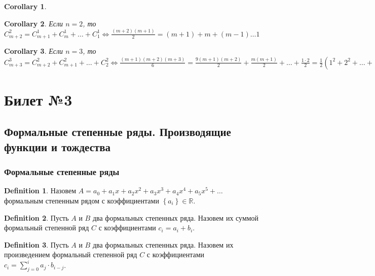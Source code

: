 \documentclass[a4paper]{article}
\theoremstyle{plain}
\newtheorem{corollary}{Corollary}
\theoremstyle{remark}
\theoremstyle{definition}
\newtheorem{definition}{Definition}
\newcommand{\combru}[2]{C_{#1}^{#2}} %
\newcommand{\myR}{\mathbb{R}}
\newcommand{\mysum}{\sum\limits}
\newcommand{\myset}[1]{\left\{ #1 \right\}}
\begin{document}
\begin{itemize}
\begin{corollary}
		\end{corollary}
		\begin{corollary}
			Если $n = 2$, то $\combru{m+2}{2} = \combru{m+1}{1} + \combru{m}{1} + \ldots + \combru{1}{1} \Leftrightarrow \frac{(m + 2)(m + 1)}{2} = (m + 1) + m + (m - 1) \ldots 1$
		\end{corollary}
		\begin{corollary}
			Если $n = 3$, то $\combru{m+3}{3} = \combru{m+2}{2} + \combru{m+1}{2} + \ldots + \combru{2}{2} \Leftrightarrow \frac{(m + 1)(m + 2)(m + 3)}{6} = \frac{9(m + 1)(m + 2)}{2} + \frac{m(m + 1)}{2} + \ldots + \frac{1 \cdot 2}{2} = \frac{1}{2} (1^2 + 2^2 + \ldots + (m + 1) ^ 2) + \frac{1}{2}(1 + 2 + \ldots + (m + 1)) \Rightarrow \frac{1}{2} (1^2 + 2^2 + \ldots + (m + 1)^2) = \frac{(m + 1)(m + 2)(m + 3)}{6} - \frac{1}{4} (m + 1)(m + 2) = \frac{1}{12} (m + 1)(m + 2)(2m + 3)$
		\end{corollary}
\end{itemize}

\section{Билет №3}
\subsection{Формальные степенные ряды. Производящие функции и тождества}
\subsubsection{Формальные степенные ряды}

\begin{definition}
	Назовем $A = a_0 + a_1 x + a_2 x^2 + a_3 x^3 + a_4 x^4 + a_5 x^5 + \ldots$ формальным степенным рядом с коэффициентами $\myset{a_i} \in \myR$. 
\end{definition}

\begin{definition}
	Пусть $A$ и $B$ два формальных степенных ряда. Назовем их суммой формальный степенной ряд $C$ с коэффициентами $c_i = a_i + b_i$.
\end{definition}

\begin{definition}
	Пусть $A$ и $B$ два формальных степенных ряда. Назовем их произведением формальный степенной ряд $C$ с коэффициентами $c_i = \mysum_{j=0}^{i} a_j \cdot b_{i - j}$.
\end{definition}
\end{document}

